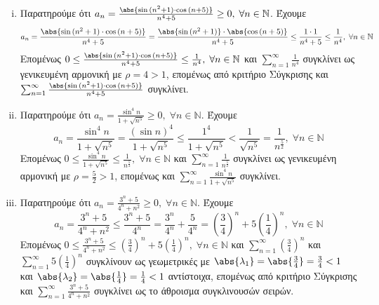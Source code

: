 \begin{enumerate}
\begin{enumerate}[i)]
        \item Παρατηρούμε ότι $ a_{n} = \frac{\abs{\sin{(n^{2}+1)} \cdot 
            \cos{(n+5)}}}{n^{4}+5} \geq 0, \; \forall n \in \mathbb{N}$. Έχουμε
            \[
                a_{n} = \frac{\abs{\sin{(n^{2}+1)} \cdot \cos{(n+5)}}}{n^{4}+5} = 
                \frac{\abs{\sin{(n^{2}+1)}} \cdot \abs{\cos{(n+5)}}}{n^{4}+5} \leq
                \frac{1 \cdot 1}{n^{4}+5} \leq \frac{1}{n^{4}}, \; \forall n 
                \in \mathbb{N}
            \] 
            Επομένως $ 0 \leq  \frac{\abs{\sin{(n^{2}+1)} \cdot 
            \cos{(n+5)}}}{n^{4}+5} \leq \frac{1}{n^{4}}, \; \forall n \in 
            \mathbb{N} $ και $ \sum_{n=1}^{\infty} \frac{1}{n^{4}} $ συγκλίνει 
            ως γενικευμένη αρμονική με $ \rho = 4 > 1 $, επομένως από 
            κριτήριο Σύγκρισης και $ \sum_{n=1}^{\infty} \frac{\abs{\sin{(n^{2}+1)}
            \cdot \cos{(n+5)}}}{n^{4}+5}  $ συγκλίνει.

        \item Παρατηρούμε ότι $ a_{n} = \frac{\sin^{4}{n}}{1+ \sqrt{n^{5}}} \geq 0, 
            \; \forall n \in \mathbb{N}$. Έχουμε
            \[
                a_{n} =  \frac{\sin^{4}{n}}{1+ \sqrt{n^{5}}} = \frac{(\sin{n} )^{4}}{1+
                \sqrt{n^{5}}} \leq \frac{1^{4}}{1+ \sqrt{n^{5}}} < 
                \frac{1}{\sqrt{n^{5}}} = \frac{1}{n^{\frac{5}{2}}}, \; 
                \forall n \in \mathbb{N}
            \] 
            Επομένως $ 0 \leq \frac{\sin^{4}{n}}{1 + \sqrt{n^{5}}} \leq
            \frac{1}{n^{\frac{5}{2}}}, \; \forall n \in \mathbb{N} $ και 
            $ \sum_{n=1}^{\infty} \frac{1}{n^{\frac{5}{2}}} $ συγκλίνει ως 
            γενικευμένη αρμονική με $ \rho = \frac{5}{2} > 1 $, επομένως και 
            $ \sum_{n=1}^{\infty} \frac{\sin^{4}{n}}{1 + \sqrt{n^{5}}} $ συγκλίνει.

        \item Παρατηρούμε ότι $ a_{n}= \frac{3^{n}+5}{4^{n}+n^{2}} \geq 0, 
            \; \forall n \in \mathbb{N}$. Έχουμε
            \[
                a_{n} = \frac{3^{n}+5}{4^{n}+n^{2}} \leq \frac{3^{n}+5}{4^{n}} = 
                \frac{3^{n}}{4^{n}} + \frac{5}{4^{n}} = 
                \left(\frac{3}{4}\right)^{n} + 5 \left(\frac{1}{4}\right)^{n} , \; 
                \forall n \in \mathbb{N}
            \] 
            Επομένως $ 0 \leq \frac{3^{n}+5}{4^{n}+n^{2}} \leq 
            \left(\frac{3}{4}\right)^{n} + 5 \left(\frac{1}{4}\right)^{n}, \; 
            \forall n \in \mathbb{N} $ και $ 
            \sum_{n=1}^{\infty} \left(\frac{3}{4} \right)^{n}  $ και $
            \sum_{n=1}^{\infty} 5 \left(\frac{1}{4} \right)^{n} $ 
            συγκλίνουν ως γεωμετρικές με 
            $ \abs{\lambda_{1}} = \abs{\frac{3}{4}} = \frac{3}{4} < 1 $ και 
            $ \abs{\lambda_{2}} = \abs{\frac{1}{4}} = \frac{1}{4} < 1 $ αντίστοιχα, 
            επομένως από κριτήριο Σύγκρισης και 
            $ \sum_{n=1}^{\infty} \frac{3^{n}+5}{4^{n}+n^{2}} $ 
            συγκλίνει ως το άθροισμα συγκλινουσών σειρών.


\end{enumerate}
\end{enumerate}
